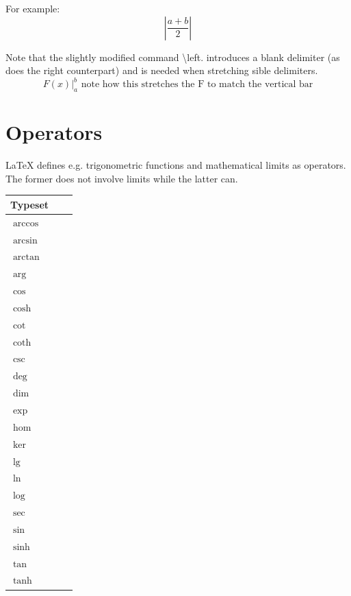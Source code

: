 \documentclass{sample}
\begin{document}
For example:
\[
\left|\frac{a+b}{2}\right|
\]

Note that the slightly modified command \textbackslash left. introduces a blank delimiter (as does the right counterpart) and is needed when stretching sible delimiters.
\[
\left. F(x) \right|_{a}^{b}\text{ note how this stretches the F to match the vertical bar}
\]

\section{Operators}
LaTeX defines e.g. trigonometric functions and mathematical limits as operators. The former does not involve limits while the latter can.
\begin{center}
	\begin{tabular}{llc}
	\toprule
	Typeset\\
	\midrule
	$\arccos$\\
	$\arcsin$\\
	$\arctan$\\
	$\arg$\\
	$\cos$\\
	$\cosh$\\
	$\cot$\\
	$\coth$\\
	$\csc$\\
	$\deg$\\
	$\dim$\\
	$\exp$\\
	$\hom$\\
	$\ker$\\
	$\lg$\\
	$\ln$\\
	$\log$\\
	$\sec$\\
	$\sin$\\
	$\sinh$\\
	$\tan$\\
	$\tanh$\\
	\bottomrule
	\end{tabular}
	\label{Ta:opsnolimit}
\end{center}
\end{document}
